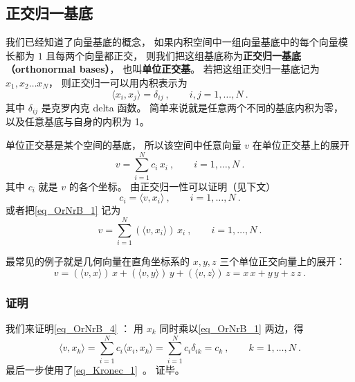 
\begin{issues}
\issueTODO
\end{issues}



\subsection{正交归一基底}

我们已经知道了向量基底的概念， 如果内积空间中一组向量基底中的每个向量模长都为 $1$ 且每两个向量都正交， 则我们把这组基底称为\textbf{正交归一基底（orthonormal bases）}， 也叫\textbf{单位正交基}。 若把这组正交归一基底记为 $x_1, x_2 \dots x_N$， 则正交归一可以用内积表示为
\begin{equation}\label{eq_OrNrB_3}
\langle x_i, x_j \rangle = \delta_{ij} ~,\qquad i,j = 1,\dots, N~.
\end{equation}
其中 $\delta_{ij}$ 是克罗内克 delta 函数。 简单来说就是任意两个不同的基底内积为零， 以及任意基底与自身的内积为 1。

单位正交基是某个空间的基底， 所以该空间中任意向量 $v$ 在单位正交基上的展开
\begin{equation}\label{eq_OrNrB_1}
v = \sum_{i = 1}^N c_i \, x_i ~,\qquad i = 1, \dots, N~.
\end{equation}
其中 $c_i$ 就是 $v$ 的各个坐标。 由正交归一性可以证明（见下文）
\begin{equation}\label{eq_OrNrB_4}
c_i = \langle v, x_i \rangle ~,\qquad i = 1, \dots, N~.
\end{equation}
或者把\autoref{eq_OrNrB_1} 记为
\begin{equation}\label{eq_OrNrB_5}
v = \sum_{i = 1}^N (\langle v, x_i \rangle) \, x_i~, \qquad i = 1, \dots, N~.
\end{equation}

最常见的例子就是几何向量在直角坐标系的 $x, y, z$ 三个单位正交向量上的展开：
\begin{equation}
v = (\langle v, x \rangle)\, x + (\langle v, y \rangle)\, y + (\langle v, z \rangle)\, z = x \, x + y \, y + z \, z~.
\end{equation} 

\subsubsection{证明}
我们来证明\autoref{eq_OrNrB_4} ： 用 $x_k$ 同时乘以\autoref{eq_OrNrB_1} 两边，得
\begin{equation}\label{eq_OrNrB_2}
\langle v, x_k \rangle = \sum_{i = 1}^N c_i \langle x_i, x_k \rangle = \sum_{i = 1}^N c_i \delta_{ik} = c_k ~,\qquad k = 1, \dots, N~.
\end{equation}
最后一步使用了\autoref{eq_Kronec_1}~。 证毕。

